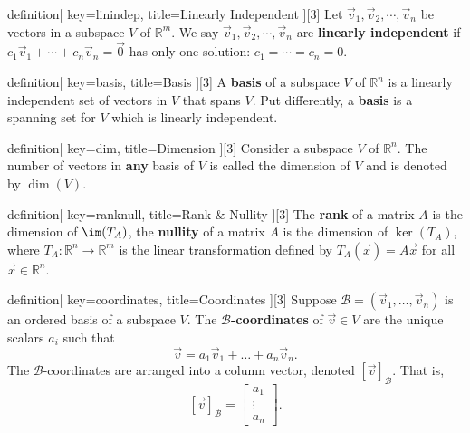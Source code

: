 \begin{SaveConcept}{definition}[
		key=linindep,
		title={Linearly Independent}
	][3]
        Let $\vec v_1, \vec v_2, \cdots ,\vec v_n$ be vectors in a subspace $V$ of $\mathbb R^m$. We say $\vec v_1, \vec v_2, \cdots ,\vec v_n$ are  {\bf linearly independent} if $c_1\vec{v}_1+\cdots+c_n\vec{v}_n=\vec{0}$ has only one solution: $c_1=\cdots=c_n=0$. 
\end{SaveConcept}



\begin{SaveConcept}{definition}[
		key=basis,
		title={Basis}
	][3]
        A {\bf basis} of a subspace $V$ of $\mathbb R^n$ is a linearly independent set of vectors in $V$ that spans $V$. Put differently, a {\bf basis} is a spanning set for $V$ which is linearly independent. 
\end{SaveConcept}


\begin{SaveConcept}{definition}[
		key=dim,
		title={Dimension}
	][3]
      Consider a subspace $V$ of $\mathbb R^n$. The number of vectors in \textbf{any} basis of $V$ is called the dimension of $V$ and is denoted by $\dim(V)$. 
\end{SaveConcept}


\begin{SaveConcept}{definition}[
		key=ranknull,
		title={Rank \& Nullity}
	][3]
       The {\bf rank} of a matrix $A$ is the dimension of $\im(T_A)$, the \textbf{nullity} of a matrix $A$ is the  dimension of $\ker(T_A)$, where $T_A:\mathbb R^n\to\mathbb R^m$ is the linear transformation defined by $T_A(\vec{x})=A\vec{x}$ for all $\vec{x}\in\mathbb R^n$.
\end{SaveConcept}


\begin{SaveConcept}{definition}[
		key=coordinates,
		title={Coordinates}
	][3]
        Suppose $\mathcal{B} = (\vec v_1, \ldots  , \vec v_n)$ is an ordered basis of a subspace $V$. The {\bf  $\mathcal B$-coordinates} of  $\vec v \in V$  are the unique scalars $a_i$ such that 
        $$
        \vec v = a_1 \vec v_1 + \dots + a_n \vec v_n. 
        $$ 
        The $\mathcal B$-coordinates are arranged into  a column vector, denoted  $[\vec v]_{\mathcal B}.$ That is,
        $$ 
        [\vec v]_{\mathcal B} = \begin{bmatrix} a_1 \\ \vdots \\ a_n  \end{bmatrix}.
        $$
\end{SaveConcept}


